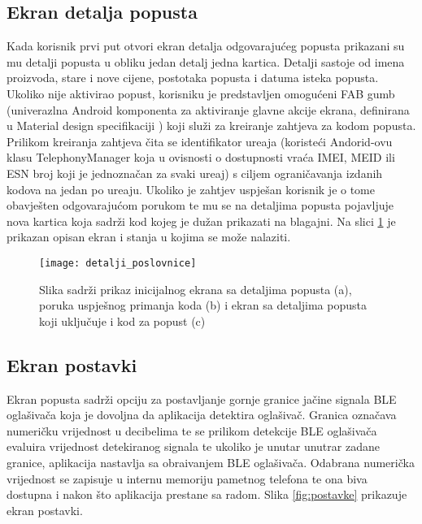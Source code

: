 \subsection{Ekran detalja popusta}

Kada korisnik prvi put otvori ekran detalja odgovaraju\'{c}eg popusta prikazani su mu detalji popusta u obliku jedan detalj jedna kartica. Detalji sastoje od imena proizvoda, stare i nove cijene, postotaka popusta i datuma isteka popusta. Ukoliko nije aktivirao popust, korisniku je predstavljen omogu\'{c}eni FAB gumb (univerazlna Android komponenta za aktiviranje glavne akcije ekrana, definirana u Material design specifikaciji \cite{materialDesign}) koji slu\v{z}i za kreiranje zahtjeva za kodom popusta. Prilikom kreiranja zahtjeva \v{c}ita se identifikator ure\dj aja (koriste\'{c}i Andorid-ovu klasu TelephonyManager \cite{telephonyManager} koja u ovisnosti o dostupnosti vra\'{c}a IMEI, MEID ili ESN broj koji je jednozna\v{c}an za svaki ure\dj aj) s ciljem ograni\v{c}avanja izdanih kodova na jedan po ure\dj aju. Ukoliko je zahtjev uspje\v{s}an korisnik je o tome obavje\v{s}ten odgovaraju\'{c}om porukom te mu se na detaljima popusta pojavljuje nova kartica koja sadr\v{z}i kod kojeg je du\v{z}an prikazati na blagajni. Na slici \ref{fig:detalji_poslovnice} je prikazan opisan ekran i stanja u kojima se mo\v{z}e nalaziti.



\begin{figure}[!htbp]
	\begin{center}
 \texttt{[image: detalji\_poslovnice]}
 \caption{Slika sadr\v{z}i prikaz inicijalnog ekrana sa detaljima popusta (a), poruka uspje\v{s}nog primanja koda (b) i ekran sa detaljima popusta koji uklju\v{c}uje i kod za popust (c)}
 \label{fig:detalji_poslovnice}
	\end{center}
\end{figure}


\subsection{Ekran postavki}
Ekran popusta sadr\v{z}i opciju za postavljanje gornje granice ja\v{c}ine signala BLE ogla\v{s}iva\v{c}a koja je dovoljna da aplikacija detektira ogla\v{s}iva\v{c}. Granica ozna\v{c}ava numeri\v{c}ku vrijednost u decibelima te se prilikom detekcije BLE ogla\v{s}iva\v{c}a evaluira vrijednost detekiranog signala te ukoliko je unutar unutrar zadane granice, aplikacija nastavlja sa obra\dj ivanjem BLE ogla\v{s}iva\v{c}a.
Odabrana numeri\v{c}ka vrijednost se zapisuje u internu memoriju pametnog telefona te ona biva dostupna i nakon \v{s}to aplikacija prestane sa radom. Slika \ref{fig:postavke} prikazuje ekran postavki.


